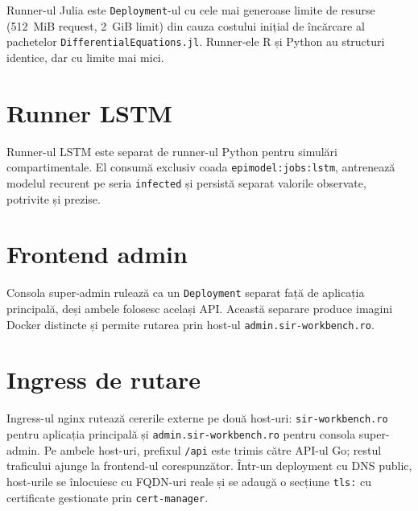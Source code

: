 Runner-ul Julia este \texttt{Deployment}-ul cu cele mai generoase limite
de resurse (512~MiB request, 2~GiB limit) din cauza costului inițial de
încărcare al pachetelor \texttt{DifferentialEquations.jl}. Runner-ele
R și Python au structuri identice, dar cu limite mai mici.



\section*{Runner LSTM}

Runner-ul LSTM este separat de runner-ul Python pentru simulări
compartimentale. El consumă exclusiv coada \texttt{epimodel:jobs:lstm},
antrenează modelul recurent pe seria \texttt{infected} și persistă separat
valorile observate, potrivite și prezise.



\section*{Frontend admin}

Consola super-admin rulează ca un \texttt{Deployment} separat față de aplicația
principală, deși ambele folosesc același API. Această separare produce imagini
Docker distincte și permite rutarea prin host-ul \texttt{admin.sir-workbench.ro}.



\section*{Ingress de rutare}

Ingress-ul nginx rutează cererile externe pe două host-uri: \texttt{sir-workbench.ro}
pentru aplicația principală și \texttt{admin.sir-workbench.ro} pentru consola
super-admin. Pe ambele host-uri, prefixul \texttt{/api} este trimis către API-ul
Go; restul traficului ajunge la frontend-ul corespunzător. Într-un deployment
cu DNS public, host-urile se înlocuiesc cu FQDN-uri reale și se adaugă o
secțiune \texttt{tls:} cu certificate gestionate prin \texttt{cert-manager}.

